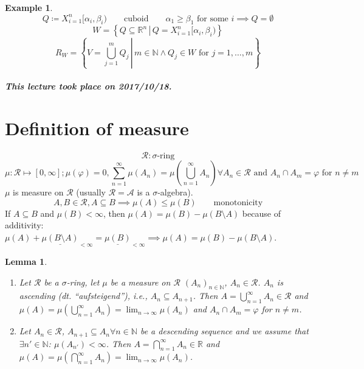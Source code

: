 \documentclass{article}
\newtheorem{example}{Example}  \numberwithin{example}{section}
\newtheorem{lemma}{Lemma}  \numberwithin{lemma}{section}
\newcommand{\setdef}[2]{\left\{\left.#1\,\right|\,#2\right\}}
\newcommand{\dateref}[1]{\paragraph{\textit{This lecture took place on #1.}}}
\begin{document}

\begin{example}
  \[ Q \coloneqq X_{i=1}^n [\alpha_i, \beta_i) \qquad \text{cuboid} \qquad \alpha_1 \geq \beta_1 \text{ for some } i \implies Q = \emptyset \]
  \[ W = \setdef{Q \subseteq \mathbb R^n}{Q = X_{i=1}^n [\alpha_i, \beta_i)} \]
  \[ R_W = \setdef{V = \bigcup_{j=1}^m Q_j}{m \in \mathbb N \land Q_j \in W \text{ for } j = 1,\ldots,m} \]
\end{example}

\dateref{2017/10/18}
\section{Definition of measure}
\[ \mathcal R: \sigma\text{-ring} \]
\[
    \mu: \mathcal R \mapsto [0, \infty];
    \mu(\varphi) = 0,
    \sum_{n=1}^\infty \mu(A_n) = \mu(\bigcup_{n=1}^\infty A_n) \forall A_n \in \mathcal R \text{ and } A_n \cap A_m = \varphi \text{ for } n \neq m
\]
$\mu$ is measure on $\mathcal R$ (usually $\mathcal R = \mathcal A$ is a $\sigma$-algebra).
\[ A, B \in \mathcal R, A \subseteq B \implies \mu(A) \leq \mu(B) \qquad \text{monotonicity} \]
If $A \subseteq B$ and $\mu(B) < \infty$, then $\mu(A) = \mu(B) - \mu(B \setminus A)$
because of additivity: $\mu(A) + \underline{\mu(B \setminus A)}_{< \infty} = \underline{\mu(B)}_{< \infty} \implies \mu(A) = \mu(B) - \mu(B \setminus A)$.

\begin{lemma}
  \label{l:nine}
  \begin{enumerate}
    \item
      Let $\mathcal R$ be a $\sigma$-ring, let $\mu$ be a measure on $\mathcal R$ $(A_n)_{n \in \mathbb N}$, $A_n \in \mathcal R$.
      $A_n$ is ascending (dt. \enquote{aufsteigend}), i.e., $A_n \subseteq A_{n+1}$. Then $A = \bigcup_{n=1}^\infty A_n \in \mathcal R$
      and $\mu(A) = \mu\left(\bigcup_{n=1}^\infty A_n\right) = \lim_{n \to \infty} \mu(A_n)$
      and $A_n \cap A_m = \varphi$ for $n \neq m$.
    \item
      Let $A_n \in \mathcal R$, $A_{n+1} \subseteq A_n \forall n \in \mathbb N$ be a descending sequence
      and we assume that $\exists n' \in \mathbb N$: $\mu(A_{n'}) < \infty$.
      Then $A = \bigcap_{n=1}^\infty A_n \in \mathbb R$ and $\mu(A) = \mu(\bigcap_{n=1}^\infty A_n) = \lim_{n\to\infty} \mu(A_n)$.
  \end{enumerate}
\end{lemma}
\end{document}
